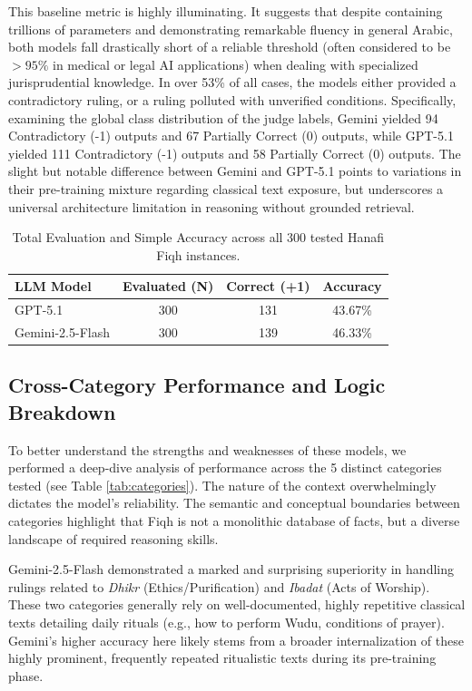 This baseline metric is highly illuminating. It suggests that despite containing trillions of parameters and demonstrating remarkable fluency in general Arabic, both models fall drastically short of a reliable threshold (often considered to be $>95\%$ in medical or legal AI applications) when dealing with specialized jurisprudential knowledge. In over 53\% of all cases, the models either provided a contradictory ruling, or a ruling polluted with unverified conditions. Specifically, examining the global class distribution of the judge labels, Gemini yielded 94 Contradictory (-1) outputs and 67 Partially Correct (0) outputs, while GPT-5.1 yielded 111 Contradictory (-1) outputs and 58 Partially Correct (0) outputs. The slight but notable difference between Gemini and GPT-5.1 points to variations in their pre-training mixture regarding classical text exposure, but underscores a universal architecture limitation in reasoning without grounded retrieval.

\begin{table}[h]
\centering
\begin{tabular}{lccc}
\toprule
\textbf{LLM Model} & \textbf{Evaluated (N)} & \textbf{Correct (+1)} & \textbf{Accuracy} \\
\midrule
GPT-5.1 & 300 & 131 & 43.67\% \\
Gemini-2.5-Flash & 300 & 139 & 46.33\% \\
\bottomrule
\end{tabular}
\caption{Total Evaluation and Simple Accuracy across all 300 tested Hanafi Fiqh instances.}
\label{tab:overall}
\end{table}

\subsection{Cross-Category Performance and Logic Breakdown}
To better understand the strengths and weaknesses of these models, we performed a deep-dive analysis of performance across the 5 distinct categories tested (see Table \ref{tab:categories}). The nature of the context overwhelmingly dictates the model's reliability. The semantic and conceptual boundaries between categories highlight that Fiqh is not a monolithic database of facts, but a diverse landscape of required reasoning skills.

Gemini-2.5-Flash demonstrated a marked and surprising superiority in handling rulings related to \textit{Dhikr} (Ethics/Purification) and \textit{Ibadat} (Acts of Worship). These two categories generally rely on well-documented, highly repetitive classical texts detailing daily rituals (e.g., how to perform Wudu, conditions of prayer). Gemini's higher accuracy here likely stems from a broader internalization of these highly prominent, frequently repeated ritualistic texts during its pre-training phase.


